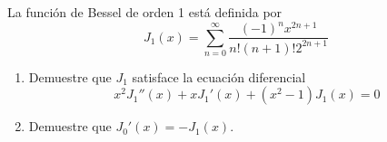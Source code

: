 \item La función de Bessel de orden 1 está definida por
    \[ J_1(x) = \sum_{n=0}^\infty \frac{(-1)^n x^{2n+1}}{n!(n+1)! 2^{2n+1}} \]
    \begin{enumerate}
        \item[(a)] Demuestre que $J_1$ satisface la ecuación diferencial
        \[ x^2 J_1''(x) + x J_1'(x) + (x^2 - 1)J_1(x) = 0 \]
        \item[(b)] Demuestre que $J_0'(x) = -J_1(x)$.
    \end{enumerate}
